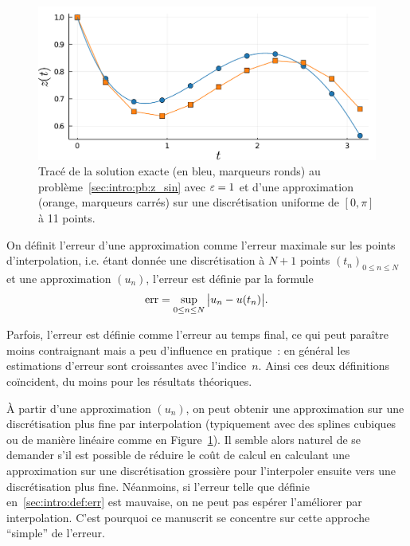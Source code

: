 \begin{figure}[!ht]
    \centering
    \includegraphics[width=.9\textwidth]{./Presentation/approx_sin.pdf}
    \caption{Tracé de la solution exacte (en bleu, marqueurs ronds) au problème~\eqref{sec:intro:pb:z_sin} avec $\varepsilon = 1$ et d'une approximation (orange, marqueurs carrés) sur une discrétisation uniforme de $[0,\pi]$ à 11 points.}
    \label{sec:intro:fig:approx_sin}
\end{figure}


\begin{FRdefinition*}
    On définit l'erreur d'une approximation comme l'erreur maximale sur les points d'interpolation, i.e. étant donnée une discrétisation à $N+1$ points $(t_n)_{0 \leq n \leq N}$ et une approximation $(u_n)$, l'erreur est définie par la formule 
    \begin{equation} \label{sec:intro:def:err}
        \operatorname{err} = \sup_{0 \leq n \leq N}\big| u_n - u(t_n) \big| .
    \end{equation}
\end{FRdefinition*}
Parfois, l'erreur est définie comme l'erreur au temps final, ce qui peut paraître moins contraignant mais a peu d'influence en pratique~: en général les estimations d'erreur sont croissantes avec l'indice~$n$. Ainsi ces deux définitions coïncident, du moins pour les résultats théoriques.

\begin{FRremark*}
    À partir d'une approximation $(u_n)$, on peut obtenir une approximation sur une discrétisation plus fine par interpolation (typiquement avec des splines cubiques ou de manière linéaire comme en Figure~\ref{sec:intro:fig:approx_sin}). Il semble alors naturel de se demander s'il est possible de réduire le coût de calcul en calculant une approximation sur une discrétisation grossière pour l'interpoler ensuite vers une discrétisation plus fine. Néanmoins, si l'erreur telle que définie en~\eqref{sec:intro:def:err} est mauvaise, on ne peut pas espérer l'améliorer par interpolation. C'est pourquoi ce manuscrit se concentre sur cette approche \enquote{simple} de l'erreur.
\end{FRremark*}

